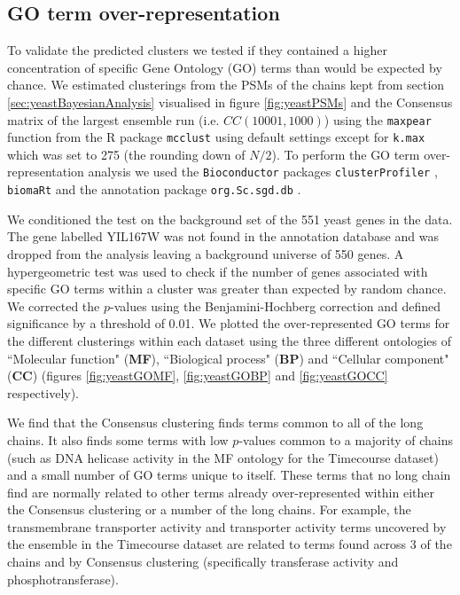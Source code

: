 \documentclass[]{article}
\begin{document}
\subsection{GO term over-representation} \label{sec:goTermOverRep}
To validate the predicted clusters we tested if they contained a higher concentration of specific Gene Ontology (GO) terms than would be expected by chance. We estimated clusterings from the PSMs of the chains kept from section \ref{sec:yeastBayesianAnalysis} visualised in figure \ref{fig:yeastPSMs} and the Consensus matrix of the largest ensemble run (i.e. $CC(10001, 1000)$) using the \texttt{maxpear} function from the R package \texttt{mcclust} \cite{fritsch2012mcclust} using default settings except for \texttt{k.max} which was set to 275 (the rounding down of $N/2$). To perform the GO term over-representation analysis we used the \texttt{Bioconductor} packages \texttt{clusterProfiler} \citep{yu2012clusterProfiler}, \texttt{biomaRt} \citep{durinck2009mapping} and the annotation package \texttt{org.Sc.sgd.db} \citep{carlson2014org}.

We conditioned the test on the background set of the 551 yeast genes in the data. The gene labelled YIL167W was not found in the annotation database and was dropped from the analysis leaving a background universe of 550 genes. A hypergeometric test was used to check if the number of genes associated with specific GO terms within a cluster was greater than expected by random chance. We corrected the $p$-values using the Benjamini-Hochberg correction \citep{benjamini1995controlling} and defined significance by a threshold of 0.01. We plotted the over-represented GO terms for the different clusterings within each dataset using the three different ontologies of ``Molecular function" (\textbf{MF}), ``Biological process" (\textbf{BP}) and ``Cellular component" (\textbf{CC}) (figures \ref{fig:yeastGOMF}, \ref{fig:yeastGOBP} and \ref{fig:yeastGOCC} respectively). 

We find that the Consensus clustering finds terms common to all of the long chains. It also finds some terms with low $p$-values common to a majority of chains (such as DNA helicase activity in the MF ontology for the Timecourse dataset) and a small number of GO terms unique to itself. These terms that no long chain find are normally related to other terms already over-represented within either the Consensus clustering or a number of the long chains. For example, the transmembrane transporter activity and transporter activity terms uncovered by the ensemble in the Timecourse dataset are related to terms found across 3 of the chains and by Consensus clustering (specifically transferase activity and phosphotransferase). 
\end{document}
